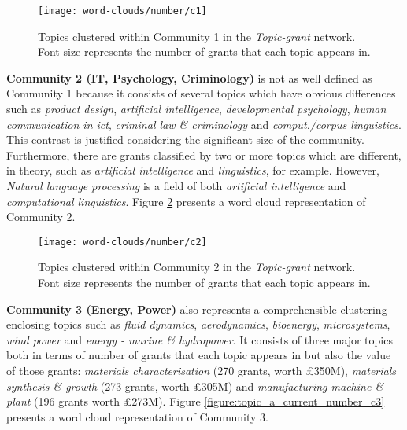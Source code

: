 \begin{figure}[!htbp]
    \centering
    \texttt{[image: word-clouds/number/c1]}
    \caption[Topics clustered within Community 1 in the \textit{Topic-grant} network]{Topics clustered within Community 1 in the \textit{Topic-grant} network. Font size represents the number of grants that each topic appears in.}
    \label{figure:topic_a_current_number_c1}
\end{figure}

\noindent\textbf{Community 2 (IT, Psychology, Criminology)} is not as well defined as Community 1 because it consists of several topics which have obvious differences such as \textit{product design}, \textit{artificial intelligence}, \textit{developmental psychology}, \textit{human communication in ict}, \textit{criminal law \& criminology} and \textit{comput./corpus linguistics}. This contrast is justified considering the significant size of the community. Furthermore, there are grants classified by two or more topics which are different, in theory, such as \textit{artificial intelligence} and \textit{linguistics}, for example. However, \textit{Natural language processing} is a field of both \textit{artificial intelligence} and \textit{computational linguistics}. Figure \ref{figure:topic_a_current_number_c2} presents a word cloud representation of Community 2.

\begin{figure}[!htbp]
    \centering
    \texttt{[image: word-clouds/number/c2]}
    \caption[Topics clustered within Community 2 in the \textit{Topic-grant} network]{Topics clustered within Community 2 in the \textit{Topic-grant} network. Font size represents the number of grants that each topic appears in.}
    \label{figure:topic_a_current_number_c2}
\end{figure}

\noindent\textbf{Community 3 (Energy, Power)} also represents a comprehensible clustering enclosing topics such as \textit{fluid dynamics}, \textit{aerodynamics}, \textit{bioenergy}, \textit{microsystems}, \textit{wind power} and \textit{energy - marine \& hydropower}. It consists of three major topics both in terms of number of grants that each topic appears in but also the value of those grants: \textit{materials characterisation} (270 grants, worth \pounds350M), \textit{materials synthesis \& growth} (273 grants, worth \pounds305M) and \textit{manufacturing machine \& plant} (196 grants worth \pounds273M). Figure \ref{figure:topic_a_current_number_c3} presents a word cloud representation of Community 3.


